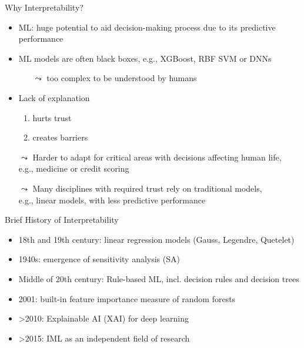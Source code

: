 \documentclass[11pt,compress,t,notes=noshow, aspectratio=169, xcolor=table]{beamer}
\begin{document}
\begin{frame}{Why Interpretability?}
		\begin{itemize}
			\item ML: huge potential to aid decision-making process due to its predictive performance
			\pause
			\item ML models are often black boxes, e.g., XGBoost, RBF SVM or DNNs
			\begin{itemize}
				\item[$\leadsto$] too complex to be understood by humans
			\end{itemize}
			\pause
			\item Lack of explanation
			\begin{enumerate}
				\item hurts trust
				\item creates barriers
			\end{enumerate}
			\pause
		    \item[$\leadsto$] Harder to adapt for critical areas with decisions affecting human life,\\
		    e.g., medicine or credit scoring
			\pause
			\item[$\leadsto$] Many disciplines with required trust rely on traditional models,\\ e.g., linear models, with less predictive performance
		\end{itemize}
	\end{frame}


	\begin{frame}{Brief History of Interpretability}
		\begin{itemize}
			\item 18th and 19th century: linear regression models (Gauss, Legendre, Quetelet)
			\medskip
			\item 1940s: emergence of sensitivity analysis (SA)
			\medskip
			\item Middle of 20th century: Rule-based ML, incl. decision rules and decision trees
			\medskip
			\item 2001: built-in feature importance measure of random forests
			\medskip
			\item >2010: Explainable AI (XAI) for deep learning
			\medskip
			\item >2015: IML as an independent field of research
		\end{itemize}
	\end{frame}
\end{document}
